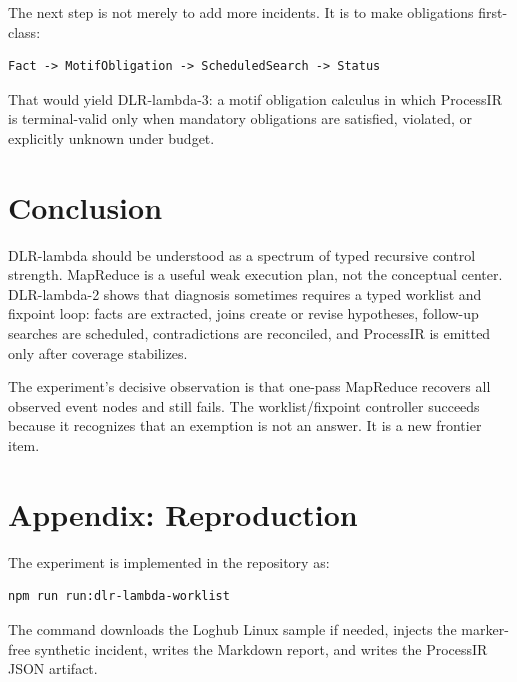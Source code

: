 \documentclass[11pt]{article}
\begin{document}
The next step is not merely to add more incidents. It is to make obligations
first-class:

\begin{verbatim}
Fact -> MotifObligation -> ScheduledSearch -> Status
\end{verbatim}

That would yield DLR-lambda-3: a motif obligation calculus in which ProcessIR is
terminal-valid only when mandatory obligations are satisfied, violated, or
explicitly unknown under budget.

\section{Conclusion}

DLR-lambda should be understood as a spectrum of typed recursive control
strength. MapReduce is a useful weak execution plan, not the conceptual center.
DLR-lambda-2 shows that diagnosis sometimes requires a typed worklist and
fixpoint loop: facts are extracted, joins create or revise hypotheses,
follow-up searches are scheduled, contradictions are reconciled, and ProcessIR
is emitted only after coverage stabilizes.

The experiment's decisive observation is that one-pass MapReduce recovers all
observed event nodes and still fails. The worklist/fixpoint controller succeeds
because it recognizes that an exemption is not an answer. It is a new frontier
item.

\appendix

\section{Appendix: Reproduction}

The experiment is implemented in the repository as:

\begin{verbatim}
npm run run:dlr-lambda-worklist
\end{verbatim}

The command downloads the Loghub Linux sample if needed, injects the marker-free
synthetic incident, writes the Markdown report, and writes the ProcessIR JSON
artifact.
\end{document}
